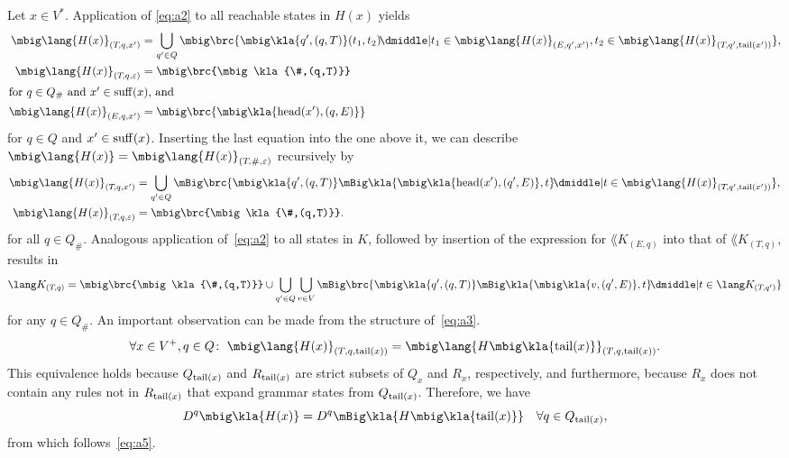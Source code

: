 Let $x\in V^*$. Application of \eqref{eq:a2} to all reachable states in $H(x)$ yields
\begin{align*}
 \mbig\lang{H(x)}_{(T\!,q,x')} &= \bigcup_{q'\in Q}\mbig\brc{\mbig\kla{q',(q,T)}(t_1,t_2) \!\pipe t_1\in\mbig\lang{H(x)}_{(E,q',x')}, t_2\in\mbig\lang{H(x)}_{(T\!,q',\cdr(x'))}}, \\
 \mbig\lang{H(x)}_{(T\!,q,\eps)} &= \mbig\brc{\mbig\kla{\#,(q,T)}} \\
 \intertext{for $q\in Q_\#$ and $x'\in\suff(x)$, and}
 \mbig\lang{H(x)}_{(E,q,x')} &= \mbig\brc{\mbig\kla{\car(x'),(q,E)}}
\end{align*}
for $q\in Q$ and $x'\in\operatorname{suff}(x)$. Inserting the last equation into the one above it, we can describe $\mbig\lang{H(x)} = \mbig\lang{H(x)}_{(T\!,\#,\eps)}$ recursively by
\begin{subequations}\label{eq:a3}\begin{align}
 \mbig\lang{H(x)}_{(T\!,q,x')} &= \bigcup_{q'\in Q}\mBig\brc{\mbig\kla{q',(q,T)}\mBig\kla{\mbig\kla{\car(x'),(q',E)},t} \!\pipe t\in\mbig\lang{H(x)}_{(T\!,q',\cdr(x'))}}, \label{eq:a3a} \\
 \mbig\lang{H(x)}_{(T\!,q,\eps)} &= \mbig\brc{\mbig\kla{\#,(q,T)}}. \label{eq:a3b}
\end{align}\end{subequations}
for all $q\in Q_\#$. Analogous application of~\eqref{eq:a2} to all states in
$K$, followed by insertion of the expression for $\lang K_{(E,q)}$ into that of
$\lang K_{(T\!,q)}$, results in
\begin{equation}\label{eq:a4}
 \lang K_{(T\!,q)} = \mbig\brc{\mbig\kla{\#,(q,T)}} \cup \bigcup_{q'\in Q}\bigcup_{v\in V}\mBig\brc{\mbig\kla{q',(q,T)}\mBig\kla{\mbig\kla{v,(q',E)},t} \!\pipe t\in\lang K_{(T\!,q')}}
\end{equation}
for any $q\in Q_\#$. An important observation can be made from the structure of~\eqref{eq:a3}.
\begin{equation}\label{eq:a5}
 \forall x\in V^+, q\in Q\colon\;
 \mbig\lang{H(x)}_{(T,q,\cdr(x))} = \mbig\lang{H\mbig\kla{\cdr(x)}}_{(T,q,\cdr(x))}.
\end{equation}
This equivalence holds because $Q_{\operatorname{tail}(x)}$ and $R_{\operatorname{tail}(x)}$ are strict
subsets of $Q_x$ and $R_x$, respectively, and furthermore, because $R_x$ does
not contain any rules not in $R_{\operatorname{tail}(x)}$ that expand grammar states from
$Q_{\operatorname{tail}(x)}$. Therefore, we have
\[
 D^q\mbig\kla{H(x)} = D^q\mBig\kla{H\mbig\kla{\cdr(x)}} \quad\forall q\in Q_{\cdr(x)},
\]
from which follows~\eqref{eq:a5}.

